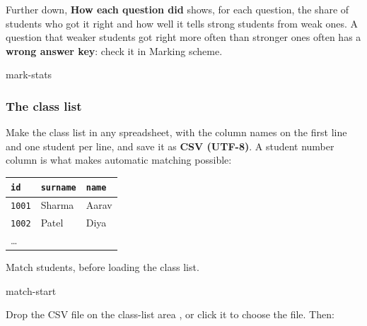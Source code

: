 \documentclass[11pt]{article}
\begin{document}
Further down, \textbf{How each question did} shows, for each question, the share of students who got it right and how well it tells strong students from weak ones. A question that weaker students got right more often than stronger ones often has a \textbf{wrong answer key}: check it in Marking scheme.

\begin{center}
\begin{shot}[0.8\linewidth]{mark-stats}\end{shot}
\end{center}

\label{step:match}

\subsubsection{The class list}

Make the class list in any spreadsheet, with the column names on the first line and one student per line, and save it as \textbf{CSV (UTF-8)}. A student number column is what makes automatic matching possible:

\begin{center}
\begin{tabular}{@{}lll@{}}\toprule\texttt{id} & \texttt{surname} & \texttt{name}\\\midrule \texttt{1001} & Sharma & Aarav\\ \texttt{1002} & Patel & Diya\\ \ldots & & \\\bottomrule\end{tabular}
\end{center}

\begin{guidefig}{Match students, before loading the class list.}
\begin{shot}[0.72\linewidth]{match-start}
\end{shot}
\end{guidefig}

Drop the CSV file on the class-list area , or click it to choose the file. Then:
\end{document}
